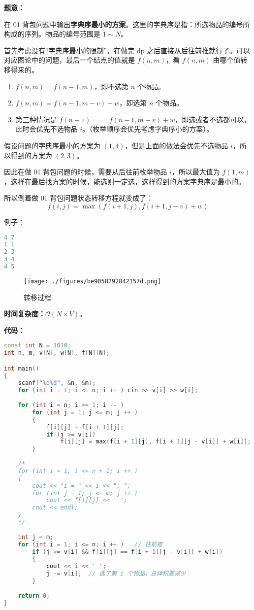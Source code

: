 \textbf{题意：}

在 01 背包问题中输出\textbf{字典序最小的方案}。这里的字典序是指：所选物品的编号所构成的序列。物品的编号范围是 $1 \sim N$。

首先考虑没有“字典序最小的限制”，在做完 dp 之后直接从后往前推就行了。可以对应图论中的问题，最后一个结点的值就是 $f(n, m)$，看 $f(n, m)$ 由哪个值转移得来的。

\begin{enumerate}
\item $f(n, m) = f(n - 1, m)$，即不选第 $n$ 个物品。
\item $f(n, m) = f(n - 1, m - v) + w$，即选第 $n$ 个物品。
\item 第三种情况是 $f(n - 1) == f(n - 1, m - v) + w$，即选或者不选都可以，此时会优先不选物品 $i$。（枚举顺序会优先考虑字典序小的方案）。
\end{enumerate}

假设问题的字典序最小的方案为 $(1, 4)$，但是上面的做法会优先不选物品 $i$，所以得到的方案为 $(2, 3)$。

因此在做 01 背包问题的时候，需要从后往前枚举物品 $i$，所以最大值为  $f(1, m)$，这样在最后找方案的时候，能选则一定选，这样得到的方案字典序是最小的。

所以倒着做 01 背包问题状态转移方程就变成了：
\begin{equation}
f(i, j) = \max(f(i + 1, j), f(i + 1, j - v) + w)
\end{equation}

例子：

\begin{lstlisting}[language=cpp]
4 7
1 1 
2 3 
3 4
4 5
\end{lstlisting}

\begin{figure}[ht]
\centering
\texttt{[image: ./figures/be9058292842157d.png]}
\caption{转移过程} \label{fig_dp1_1}
\end{figure}

\textbf{时间复杂度：}$\mathcal{O}(N \times V)$。

\textbf{代码：}

\begin{lstlisting}[language=cpp]
const int N = 1010;
int n, m, v[N], w[N], f[N][N];

int main()
{
    scanf("%d%d", &n, &m);
    for (int i = 1; i <= n; i ++ ) cin >> v[i] >> w[i];
    
    for (int i = n; i >= 1; i -- )
        for (int j = 1; j <= m; j ++ )
        {
            f[i][j] = f[i + 1][j];
            if (j >= v[i])
            	f[i][j] = max(f[i + 1][j], f[i + 1][j - v[i]] + w[i]);
        }
      
    /* 
    for (int i = 1; i <= n + 1; i ++ )
    {
        cout << "i = " << i << ": ";
        for (int j = 1; j <= m; j ++ )
            cout << f[i][j] << ' ';
        cout << endl;
    }
    */
    
    int j = m;
    for (int i = 1; i <= n; i ++ )   // 往前推
        if (j >= v[i] && f[i][j] == f[i + 1][j - v[i]] + w[i])
        {
            cout << i << ' ';
            j -= v[i];  // 选了第 i 个物品，总体积要减少
        }
    
    return 0;
}
\end{lstlisting}

